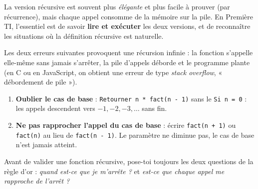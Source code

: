 \documentclass[11pt]{article}
\newcommand{\cle}[1]{{\popxbold\color{popdark}#1}}
\begin{document}
La version récursive est souvent plus \emph{élégante} et plus facile à prouver (par récurrence), mais chaque appel consomme de la mémoire sur la pile. En Première TI, l'essentiel est de savoir \textbf{lire et exécuter} les deux versions, et de reconnaître les situations où la définition récursive est naturelle.

\begin{attention}
Les deux erreurs suivantes provoquent une \cle{récursion infinie} : la fonction s'appelle elle-même sans jamais s'arrêter, la pile d'appels déborde et le programme plante (en C ou en JavaScript, on obtient une erreur de type \emph{stack overflow}, « débordement de pile »).
\begin{enumerate}
  \item \textbf{Oublier le cas de base} : \texttt{Retourner n * fact(n - 1)} sans le \texttt{Si n = 0} : les appels descendent vers $-1, -2, -3, \dots$ sans fin.
  \item \textbf{Ne pas rapprocher l'appel du cas de base} : écrire \texttt{fact(n + 1)} ou \texttt{fact(n)} au lieu de \texttt{fact(n - 1)}. Le paramètre ne diminue pas, le cas de base n'est jamais atteint.
\end{enumerate}
Avant de valider une fonction récursive, pose-toi toujours les deux questions de la règle d'or : \emph{quand est-ce que je m'arrête ?} et \emph{est-ce que chaque appel me rapproche de l'arrêt ?}
\end{attention}
\end{document}
